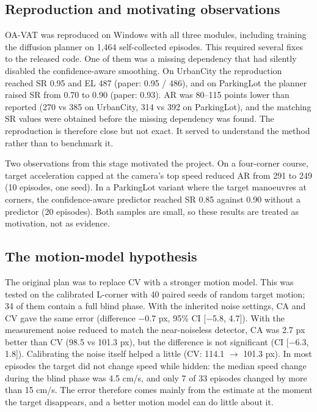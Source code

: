 \documentclass[12pt,a4paper]{article}
\begin{document}
\subsection{Reproduction and motivating observations}
OA-VAT was reproduced on Windows with all three modules, including training the diffusion planner on 1,464 self-collected episodes. This required several fixes to the released code. One of them was a missing dependency that had silently disabled the confidence-aware smoothing. On UrbanCity the reproduction reached SR 0.95 and EL 487 (paper: 0.95 / 486), and on ParkingLot the planner raised SR from 0.70 to 0.90 (paper: 0.93). AR was 80–115 points lower than reported (270 vs 385 on UrbanCity, 314 vs 392 on ParkingLot), and the matching SR values were obtained before the missing dependency was found. The reproduction is therefore close but not exact. It served to understand the method rather than to benchmark it.

Two observations from this stage motivated the project. On a four-corner course, target acceleration capped at the camera’s top speed reduced AR from 291 to 249 (10 episodes, one seed). In a ParkingLot variant where the target manoeuvres at corners, the confidence-aware predictor reached SR 0.85 against 0.90 without a predictor (20 episodes). Both samples are small, so these results are treated as motivation, not as evidence.

\subsection{The motion-model hypothesis}
The original plan was to replace CV with a stronger motion model. This was tested on the calibrated L-corner with 40 paired seeds of random target motion; 34 of them contain a full blind phase. With the inherited noise settings, CA and CV gave the same error (difference $-$0.7 px, 95\% CI [$-$5.8, 4.7]). With the measurement noise reduced to match the near-noiseless detector, CA was 2.7 px better than CV (98.5 vs 101.3 px), but the difference is not significant (CI [$-$6.3, 1.8]). Calibrating the noise itself helped a little (CV: 114.1 $\rightarrow$ 101.3 px). In most episodes the target did not change speed while hidden: the median speed change during the blind phase was 4.5 cm/s, and only 7 of 33 episodes changed by more than 15 cm/s. The error therefore comes mainly from the estimate at the moment the target disappears, and a better motion model can do little about it.
\end{document}
